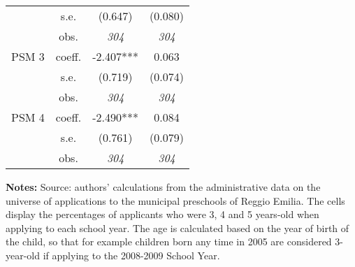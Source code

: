 \begin{table}[H]
\begin{center}
\begin{tabular}{ c c c c }
  & s.e.  & (0.647)  & (0.080) \\ [0.2em]
  & obs.  &  \emph{304} & \emph{304} \\ [0.2em]
 PSM 3 & coeff.  & -2.407{*}{*}{*} & 0.063\\ [0.2em]
  & s.e.  & (0.719)  & (0.074) \\ [0.2em]
  & obs.  &  \emph{304} & \emph{304} \\ [0.2em]
 PSM 4 & coeff.  & -2.490{*}{*}{*} & 0.084\\ [0.2em]
  & s.e.  & (0.761)  & (0.079) \\ [0.2em]
  & obs.  &  \emph{304} & \emph{304} \\ [0.2em]
\hline 
\end{tabular}
\end{center}
\footnotesize{{\bfseries Notes:} Source: authors' calculations from the administrative data on the universe of applications to the municipal preschools of Reggio Emilia. The cells display the percentages of applicants who were 3, 4 and 5 years-old when applying to each school year. The age is calculated based on the year of birth of the child, so that for example children born any time in 2005 are considered 3-year-old if applying to the 2008-2009 School Year.}
\end{table}
